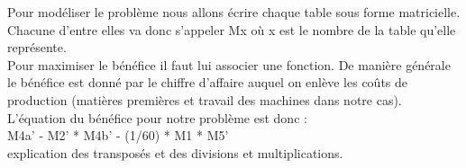 \documentclass{article}
\begin{document}
Pour modéliser le problème nous allons écrire chaque table sous forme matricielle. Chacune d'entre elles va donc s'appeler Mx où x est le nombre de la table qu'elle représente.\\

Pour maximiser le bénéfice il faut lui associer une fonction. De manière générale le bénéfice est donné par le chiffre d'affaire auquel on enlève les coûts de production (matières premières et travail des machines dans notre cas).
L'équation du bénéfice pour notre problème est donc :\\
 
M4a' - M2' * M4b' - (1/60) * M1 * M5'   \\

explication des transposés et des divisions et multiplications.
\end{document}
